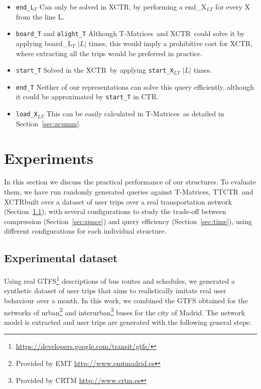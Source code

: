 \documentclass[runningheads]{llncs}
\newcommand{\acumm}{T-Matrices} %
\newcommand{\ctr}{XCTR}
\newcommand{\ttctr}{TTCTR}
\begin{document}
\begin{itemize}
    \item \texttt{end\_L$_T$} Can only be solved in \ctr, by performing a end\_X$_{LT}$ for every X from the line L.
    \item \texttt{board\_T} and \texttt{alight\_T} Although \acumm~and \ctr~could solve it by applying board\_L$_T$ $|L|$ times, this would imply a prohibitive cost for \ctr, where extracting all the trips would be preferred in practice.
    \item \texttt{start\_T} Solved in the \ctr~by applying \texttt{start\_X$_{LT}$} $|L|$ times.
    \item \texttt{end\_T} Neither of our representations can solve this query efficiently, although it could be approximated by \texttt{start\_T} in CTR.
    \item \texttt{load\_X$_{LT}$} This can be easily calculated in \acumm~as detailed in Section~\ref{sec:acumm}. 
\end{itemize}

\section{Experiments}
\label{sec:exp}
In this section we discuss the practical performance of our structures. To evaluate them, we have run randomly generated queries against \acumm, \ttctr~and \ctr built over a dataset of user trips over a real transportation network (Section~\ref{sec:data}), with several configurations to study the trade-off between compression (Section~\ref{sec:space}) and query efficiency (Section~\ref{sec:time}), using different configurations for each individual structure.

\subsection{Experimental dataset}
\label{sec:data}
Using real GTFS\footnote{\url{https://developers.google.com/transit/gtfs/}} descriptions of bus routes and schedules, we generated a synthetic dataset of user trips that aims to realistically imitate real user behaviour over a month. In this work, we combined the GTFS obtained for the networks of urban\footnote{Provided by EMT \url{http://www.emtmadrid.es}} and interurban\footnote{Provided by CRTM \url{http://www.crtm.es}} buses for the city of Madrid. The network model is extracted and user trips are generated with the following general steps:
\end{document}
